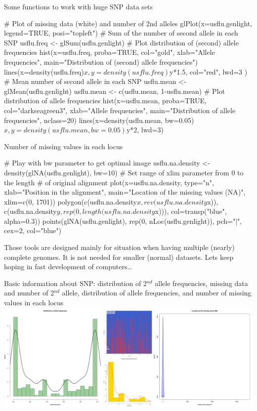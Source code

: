 \documentclass[compress, ucs, xelatex, 11pt, xcolor=svgnames,
  hyperref={
    bookmarks=true,
    unicode=true,
    colorlinks=true,
    pdftitle={Molecular data in R},
    plainpages=false,
    pdfauthor={Vojtech Zeisek},
    pdfsubject={Course about phylogeny and evolution in R},
    pdfcreator={XeLaTeX},
    pdfkeywords={R, evolution, phylogeny, molecular data},
    linkcolor=Tomato,
    anchorcolor=SaddleBrown,
    citecolor=Goldenrod,
    filecolor=DarkMagenta,
    menucolor=Sienna,
    urlcolor=DarkTurquoise,
    pdftex},
  url={hyphens, lowtilde} %
  ]{beamer}
\begin{document}
\begin{frame}[fragile]{Some functions to work with huge SNP data sets}
  \begin{spluscode}
    # Plot of missing data (white) and number of 2nd alleles
    glPlot(x=usflu.genlight, legend=TRUE, posi="topleft")
    # Sum of the number of second allele in each SNP
    usflu.freq <- glSum(usflu.genlight)
    # Plot distribution of (second) allele frequencies
    hist(x=usflu.freq, proba=TRUE, col="gold", xlab="Allele
      frequencies", main="Distribution of (second) allele frequencies")
    lines(x=density(usflu.freq)$x, y=density(usflu.freq)$y*1.5,
      col="red", lwd=3 )
    # Mean number of second allele in each SNP
    usflu.mean <- glMean(usflu.genlight)
    usflu.mean <- c(usflu.mean, 1-usflu.mean)
    # Plot distribution of allele frequencies
    hist(x=usflu.mean, proba=TRUE, col="darkseagreen3",
      xlab="Allele frequencies", main="Distribution of allele
      frequencies", nclass=20)
    lines(x=density(usflu.mean, bw=0.05)$x, y=density(usflu.mean,
      bw=0.05)$y*2, lwd=3)
  \end{spluscode}
\end{frame}

\begin{frame}[fragile]{Number of missing values in each locus}
  \begin{spluscode}
    # Play with bw parameter to get optimal image
    usflu.na.density <- density(glNA(usflu.genlight), bw=10)
    # Set range of xlim parameter from 0 to the length
    # of original alignment
    plot(x=usflu.na.density, type="n", xlab="Position in the alignment",
      main="Location of the missing values (NA)", xlim=c(0, 1701))
    polygon(c(usflu.na.density$x, rev(usflu.na.density$x)),
      c(usflu.na.density$y, rep(0, length(usflu.na.density$x))),
      col=transp("blue", alpha=0.3))
    points(glNA(usflu.genlight), rep(0, nLoc(usflu.genlight)), 
      pch="|", cex=2, col="blue")
  \end{spluscode}
\vfill
Those tools are designed mainly for situation when having multiple (nearly) complete genomes. It is not needed for smaller (normal) datasets. Lets keep hoping in fast development of computers\ldots
\end{frame}

\begin{frame}{Basic information about SNP: distribution of 2$^{nd}$ allele frequencies, missing data and number of 2$^{nd}$ allele, distribution of allele frequencies, and number of missing values in each locus}
\includegraphics[width=\textwidth]{flu_alleles.png}
\end{frame}
\end{document}
